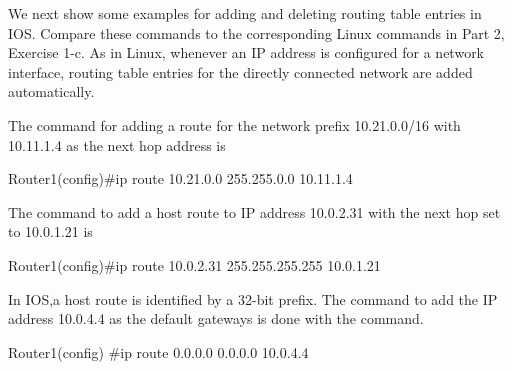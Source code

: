 
We next show some examples for adding and deleting routing table entries in IOS. Compare these commands to the corresponding Linux commands in Part 2, Exercise 1-c. As in Linux, whenever an IP address is configured for a network interface, routing table entries for the directly connected network are added automatically.

The command for adding a route for the network prefix 10.21.0.0/16 with 10.11.1.4 as the next hop address is
\begin{cmdblock}
	Router1(config)#ip route 10.21.0.0 255.255.0.0 10.11.1.4 
\end{cmdblock}

The command to add a host route to IP address 10.0.2.31 with the next hop set to 10.0.1.21 is
\begin{cmdblock}
	Router1(config)#ip route 10.0.2.31 255.255.255.255 10.0.1.21
\end{cmdblock}

In IOS,a host route is identified by a 32-bit prefix. The command to add the IP address 10.0.4.4 as the default gateways is done with the command.
\begin{cmdblock}
     Router1(config) #ip route 0.0.0.0 0.0.0.0 10.0.4.4
\end{cmdblock}

